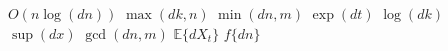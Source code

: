 \documentclass{article}
\begin{document}
$O(n\log(dn))$ $\max(dk,n)$ $\min(dn,m)$ $\exp(dt)$ $\log(dk)$ $\sup(dx)$ $\gcd(dn,m)$ $\mathbb{E}\{dX_t\}$ $f\{dn\}$
\end{document}
